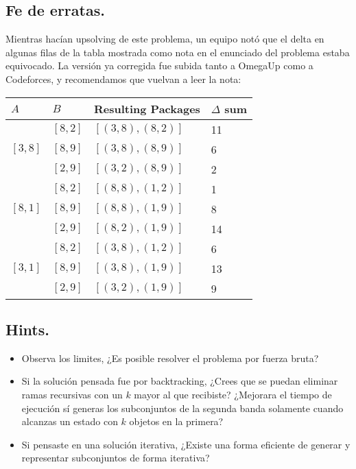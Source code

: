 \documentclass[12pt,letterpaper,titlepage]{article}
\begin{document}
\subsection{Fe de erratas.}
Mientras hacían upsolving de este problema, un equipo notó que el delta en algunas filas de la tabla mostrada como nota en el enunciado del problema estaba equivocado. La versión ya corregida fue subida tanto a OmegaUp como a Codeforces, y recomendamos que vuelvan a leer la nota:
\begin{center}
	\begin{table}[H]
		\centering
		\begin{tabular}{|l|l|l|l|}
			\hline
			$A$                      & $B$     & Resulting Packages        & $\Delta$ sum \\ \hline
			\multirow{3}{*}{$[3,8]$} & $[8,2]$ & $[(3,8),(8,2)]$ & 11           \\ \cline{2-4} 
			& $[8,9]$ & $[(3,8),(8,9)]$ & 6            \\ \cline{2-4} 
			& $[2,9]$ & $[(3,2),(8,9)]$ & 2            \\ \hline
			\multirow{3}{*}{$[8,1]$} & $[8,2]$ & $[(8,8),(1,2)]$ & 1            \\ \cline{2-4} 
			& $[8,9]$ & $[(8,8),(1,9)]$ & 8            \\ \cline{2-4} 
			& $[2,9]$ & $[(8,2),(1,9)]$ & 14           \\ \hline
			\multirow{3}{*}{$[3,1]$} & $[8,2]$ & $[(3,8),(1,2)]$ & 6            \\ \cline{2-4} 
			& $[8,9]$ & $[(3,8),(1,9)]$ & 13           \\ \cline{2-4} 
			& $[2,9]$ & $[(3,2),(1,9)]$ & 9            \\ \hline
		\end{tabular}
	\end{table}
\end{center}
\subsection{Hints.}
	\begin{itemize}
		\item Observa los limites, ¿Es posible resolver el problema por fuerza bruta?
		\item Si la solución pensada fue por backtracking, ¿Crees que se puedan eliminar ramas recursivas con un $k$ mayor al que recibiste? ¿Mejorara el tiempo de ejecución sí generas los subconjuntos de la segunda banda solamente cuando alcanzas un estado con $k$ objetos en la primera?
		\item Si pensaste en una solución iterativa, ¿Existe una forma eficiente de generar y representar subconjuntos de forma iterativa?
	\end{itemize}
\end{document}

